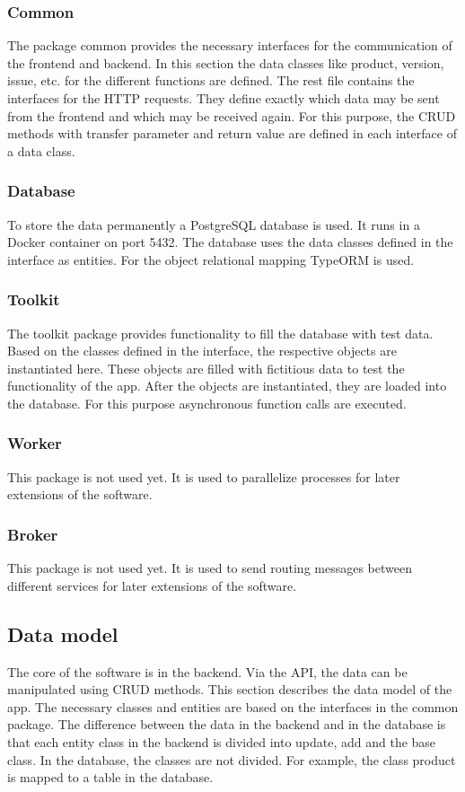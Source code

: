     \subsubsection*{Common}
    The package common provides the necessary interfaces for the communication of the frontend and backend. In this section the data classes like product, version, issue, etc. for the different functions are defined. 
    The rest file contains the interfaces for the HTTP requests. They define exactly which data may be sent from the frontend and which may be received again. For this purpose, the CRUD methods with transfer parameter and return value are defined in each interface of a data class.
    \subsubsection*{Database}
    To store the data permanently a PostgreSQL database is used. It runs in a Docker container on port 5432. The database uses the data classes defined in the interface as entities. For the object relational mapping TypeORM is used. 
    \subsubsection*{Toolkit}
    The toolkit package provides functionality to fill the database with test data. Based on the classes defined in the interface, the respective objects are instantiated here. These objects are filled with fictitious data to test the functionality of the app. After the objects are instantiated, they are loaded into the database. For this purpose asynchronous function calls are executed.
    \subsubsection*{Worker}
    This package is not used yet. It is used to parallelize processes for later extensions of the software.
    \subsubsection*{Broker}
    This package is not used yet. It is used to send routing messages between different services for later extensions of the software.

    \subsection*{Data model}
    The core of the software is in the backend. Via the API, the data can be manipulated using CRUD methods. This section describes the data model of the app. The necessary classes and entities are based on the interfaces in the common package. The difference between the data in the backend and in the database is that each entity class in the backend is divided into update, add and the base class. In the database, the classes are not divided. For example, the class product is mapped to a table in the database.

